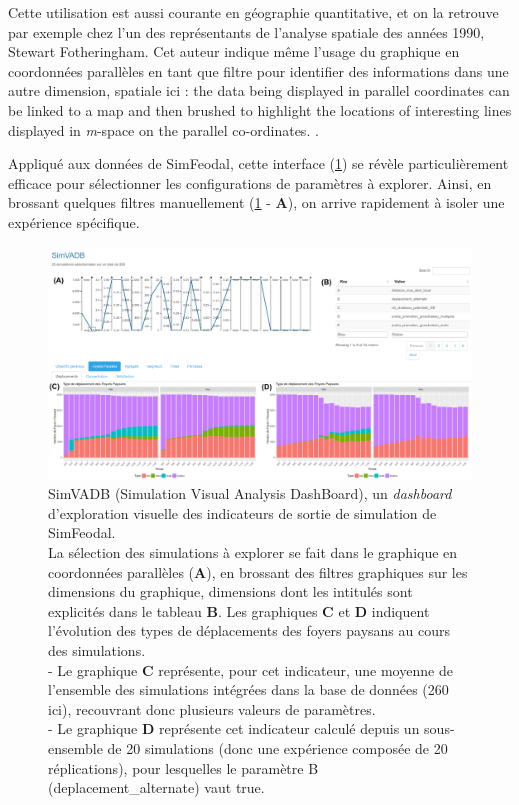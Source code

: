 	Cette utilisation est aussi courante en géographie quantitative, et on la retrouve par exemple chez l'un des représentants de l'analyse spatiale des années 1990, Stewart Fotheringham.
	Cet auteur indique même l'usage du graphique en coordonnées parallèles en tant que filtre pour identifier des informations dans une autre dimension, spatiale ici : \og the data being displayed in parallel coordinates can be linked to a map and then brushed to highlight the locations of interesting lines displayed in \textit{m}-space on the parallel co-ordinates.\fg{} \autocite{fotheringham_trends_1999}.

	Appliqué aux données de SimFeodal, cette interface (\cref{fig:simvadb_dashboard}) se révèle particulièrement efficace pour sélectionner les configurations de paramètres à explorer.
	Ainsi, en \og brossant \fg{} quelques filtres manuellement (\cref{fig:simvadb_dashboard} - \textbf{A}), on arrive rapidement à isoler une expérience spécifique.

	\begin{figure}[H]
		\captionsetup{width=\linewidth}
		\includegraphics[width=\linewidth]{img/SimVADB_Dashboard2_annote_retouche.png}
		\caption{SimVADB (Simulation Visual Analysis DashBoard), un \textit{dashboard} d'exploration visuelle des indicateurs de sortie de simulation de SimFeodal.\\
		La sélection des simulations à explorer se fait dans le graphique en coordonnées parallèles (\textbf{A}), en \og brossant\fg{} des filtres graphiques sur les \og dimensions\fg{} du graphique, dimensions dont les intitulés sont explicités dans le tableau \textbf{B}.
		Les graphiques \textbf{C} et \textbf{D} indiquent l'évolution des types de déplacements des foyers paysans au cours des simulations.\\
		- Le graphique \textbf{C} représente, pour cet indicateur, une moyenne de l'ensemble des simulations intégrées dans la base de données (260 ici), recouvrant donc plusieurs valeurs de paramètres.\\
		- Le graphique \textbf{D} représente cet indicateur calculé depuis un sous-ensemble de 20 simulations (donc une expérience composée de 20 réplications), pour lesquelles le paramètre \og \textsf{B} \fg{} (\textsf{deplacement\_alternate}) vaut \textsf{true}.}
		\label{fig:simvadb_dashboard}
	\end{figure}

